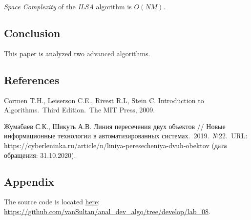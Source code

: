 \textit{Space Complexity} of the \textit{ILSA} algorithm is $O(NM)$.

\subsection{Conclusion}\label{subsec:conclusion}

This paper is analyzed two advanced algorithms.

\subsection{References}\label{subsec:references}
\begin{enumerate}[label={[\arabic*]}]
    \item Cormen T.H., Leiserson C.E., Rivest R.L, Stein C. Introduction to Algorithms.\ Third Edition.\ The MIT Press, 2009.
    \item Жумабаев С.К., Шикуть А.В. Линия пересечения двух объектов // Новые информационные технологии в автоматизированных системах.\ 2019.\ №22.\ URL: https://cyberleninka.ru/article/n/liniya-peresecheniya-dvuh-obektov (дата обращения: 31.10.2020).
\end{enumerate}

\subsection{Appendix}\label{subsec:appendix}

The source code is located \href{https://github.com/vanSultan/anal_dev_algo/tree/develop/lab_08}{here}: \url{https://github.com/vanSultan/anal_dev_algo/tree/develop/lab_08}.
